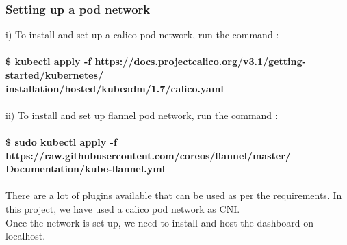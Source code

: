 \documentclass[12pt]{article}
\begin{document}
\subsubsection{Setting up a pod network}
i) To install and set up a calico pod network, run the command :\\\\
\textbf{\$ kubectl apply -f https://docs.projectcalico.org/v3.1/getting-started/kubernetes/\\installation/hosted/kubeadm/1.7/calico.yaml}\\\\
ii) To install and set up flannel pod network, run the command :\\\\
\textbf{\$ sudo kubectl apply -f https://raw.githubusercontent.com/coreos/flannel/master/\\Documentation/kube-flannel.yml}\\\\
There are a lot of plugins available that can be used as per the requirements. In this project, we have used a calico pod network as CNI.\\
Once the network is set up, we need to install and host the dashboard on localhost.
\end{document}
